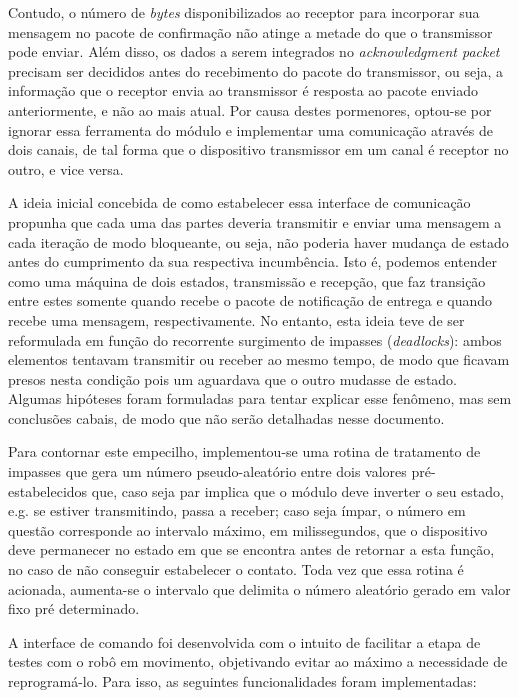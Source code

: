 Contudo, o número de \textit{bytes} disponibilizados ao receptor para incorporar sua mensagem no pacote de confirmação não atinge a metade do que o 
transmissor pode enviar.
Além disso, os dados a serem integrados no \textit{acknowledgment packet} precisam ser decididos antes do recebimento do pacote do transmissor, ou 
seja, a informação que o receptor envia ao transmissor é resposta ao pacote enviado anteriormente, e não ao mais atual.
Por causa destes pormenores, optou-se por ignorar essa ferramenta do módulo e implementar uma comunicação através de dois canais, de tal forma que 
o dispositivo transmissor em um canal é receptor no outro, e vice versa.

A ideia inicial concebida de como estabelecer essa interface de comunicação propunha que cada uma das partes deveria transmitir e enviar uma mensagem 
a cada iteração de modo bloqueante, ou seja, não poderia haver mudança de estado antes do cumprimento da sua respectiva incumbência.
Isto é, podemos entender como uma máquina de dois estados, transmissão e recepção, que faz transição entre estes somente quando recebe o pacote de 
notificação de entrega e quando recebe uma mensagem, respectivamente. 
No entanto, esta ideia teve de ser reformulada em função do recorrente surgimento de impasses (\textit{deadlocks}): ambos elementos tentavam 
transmitir ou receber ao mesmo tempo, de modo que ficavam presos nesta condição pois um aguardava que o outro mudasse de estado.
Algumas hipóteses foram formuladas para tentar explicar esse fenômeno, mas sem conclusões cabais, de modo que não serão detalhadas nesse documento.

Para contornar este empecilho, implementou-se uma rotina de tratamento de impasses que gera um número pseudo-aleatório entre dois valores 
pré-estabelecidos que, caso seja par implica que o módulo deve inverter o seu estado, e.g. se estiver transmitindo, passa a receber; caso seja 
ímpar, o número em questão corresponde ao intervalo máximo, em milissegundos, que o dispositivo deve permanecer no estado em que se encontra antes de 
retornar a esta função, no caso de não conseguir estabelecer o contato.
Toda vez que essa rotina é acionada, aumenta-se o intervalo que delimita o número aleatório gerado em valor fixo pré determinado.

A interface de comando foi desenvolvida com o intuito de facilitar a etapa de testes com o robô em movimento, objetivando evitar ao máximo a 
necessidade de reprogramá-lo. Para isso, as seguintes funcionalidades foram implementadas:

